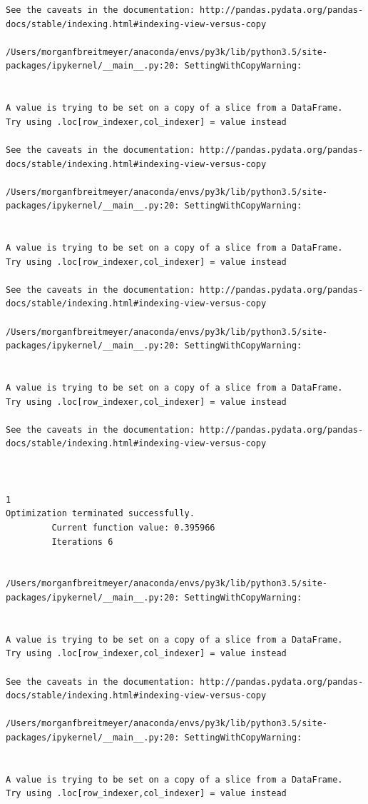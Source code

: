 \begin{lstlisting}
See the caveats in the documentation: http://pandas.pydata.org/pandas-docs/stable/indexing.html#indexing-view-versus-copy

/Users/morganfbreitmeyer/anaconda/envs/py3k/lib/python3.5/site-packages/ipykernel/__main__.py:20: SettingWithCopyWarning:


A value is trying to be set on a copy of a slice from a DataFrame.
Try using .loc[row_indexer,col_indexer] = value instead

See the caveats in the documentation: http://pandas.pydata.org/pandas-docs/stable/indexing.html#indexing-view-versus-copy

/Users/morganfbreitmeyer/anaconda/envs/py3k/lib/python3.5/site-packages/ipykernel/__main__.py:20: SettingWithCopyWarning:


A value is trying to be set on a copy of a slice from a DataFrame.
Try using .loc[row_indexer,col_indexer] = value instead

See the caveats in the documentation: http://pandas.pydata.org/pandas-docs/stable/indexing.html#indexing-view-versus-copy

/Users/morganfbreitmeyer/anaconda/envs/py3k/lib/python3.5/site-packages/ipykernel/__main__.py:20: SettingWithCopyWarning:


A value is trying to be set on a copy of a slice from a DataFrame.
Try using .loc[row_indexer,col_indexer] = value instead

See the caveats in the documentation: http://pandas.pydata.org/pandas-docs/stable/indexing.html#indexing-view-versus-copy



1
Optimization terminated successfully.
         Current function value: 0.395966
         Iterations 6


/Users/morganfbreitmeyer/anaconda/envs/py3k/lib/python3.5/site-packages/ipykernel/__main__.py:20: SettingWithCopyWarning:


A value is trying to be set on a copy of a slice from a DataFrame.
Try using .loc[row_indexer,col_indexer] = value instead

See the caveats in the documentation: http://pandas.pydata.org/pandas-docs/stable/indexing.html#indexing-view-versus-copy

/Users/morganfbreitmeyer/anaconda/envs/py3k/lib/python3.5/site-packages/ipykernel/__main__.py:20: SettingWithCopyWarning:


A value is trying to be set on a copy of a slice from a DataFrame.
Try using .loc[row_indexer,col_indexer] = value instead


\end{lstlisting}
